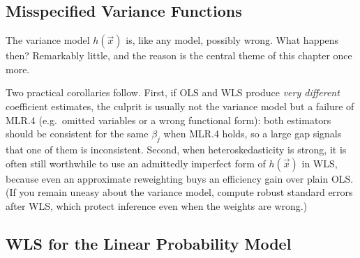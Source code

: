 
\subsection{Misspecified Variance Functions}

The variance model $h(\vec x)$ is, like any model, possibly wrong. What happens then? Remarkably little, and the reason is the central theme of this chapter once more.


Two practical corollaries follow. First, if OLS and WLS produce \emph{very different} coefficient estimates, the culprit is usually not the variance model but a failure of MLR.4 (e.g.\ omitted variables or a wrong functional form): both estimators should be consistent for the same $\beta_j$ when MLR.4 holds, so a large gap signals that one of them is inconsistent. Second, when heteroskedasticity is strong, it is often still worthwhile to use an admittedly imperfect form of $h(\vec x)$ in WLS, because even an approximate reweighting buys an efficiency gain over plain OLS. (If you remain uneasy about the variance model, compute robust standard errors after WLS, which protect inference even when the weights are wrong.)

\subsection{WLS for the Linear Probability Model}

